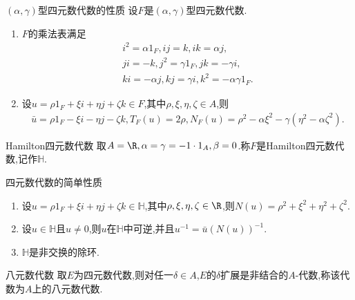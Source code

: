 \begin{proposition}{$\left(\alpha,\gamma\right)$型四元数代数的性质}{}
	设$F$是$\left(\alpha,\gamma\right)$型四元数代数.
	\begin{enumerate}
		\item $F$的乘法表满足
		\begin{gather*}
			i^{2}=\alpha 1_{F},ij=k,ik=\alpha j,\\
			ji=-k,j^{2}=\gamma 1_{F},jk=-\gamma i,\\
			ki=-\alpha j,kj=\gamma i,k^{2}=-\alpha\gamma 1_{F}.
		\end{gather*}
		\item 设$u=\rho 1_{F}+\xi i+\eta j+\zeta k\in F$,其中$\rho,\xi,\eta,\zeta\in A$,则
		\begin{align*}
			\bar{u}=\rho 1_{F}-\xi i-\eta j-\zeta k,T_{F}\left(u\right)=2\rho,N_{F}\left(u\right)=\rho^{2}-\alpha\xi^{2}-\gamma\left(\eta^{2}-\alpha\zeta^{2}\right).
		\end{align*}
	\end{enumerate}
\end{proposition}

\begin{example}{Hamilton四元数代数}{}
	取$A=\R,\alpha=\gamma=-1\cdot 1_{A},\beta=0$.称$F$是Hamilton四元数代数,记作$\mathbb{H}$.
\end{example}

\begin{proposition}{四元数代数的简单性质}{}
	\begin{enumerate}
		\item 设$u=\rho 1_{F}+\xi i+\eta j+\zeta k\in\mathbb{H}$,其中$\rho,\xi,\eta,\zeta\in\R$,则$N\left(u\right)=\rho^{2}+\xi^{2}+\eta^{2}+\zeta^{2}$.
		\item 设$u\in\mathbb{H}$且$u\neq 0$,则$u$在$\mathbb{H}$中可逆,并且$u^{-1}=\bar{u}\left(N\left(u\right)\right)^{-1}$.
		\item $\mathbb{H}$是非交换的除环.
	\end{enumerate}
\end{proposition}

\begin{example}{八元数代数}{}
	取$E$为四元数代数,则对任一$\delta\in A$,$E$的$\delta$扩展是非结合的$A$-代数,称该代数为$A$上的八元数代数.
\end{example}
































